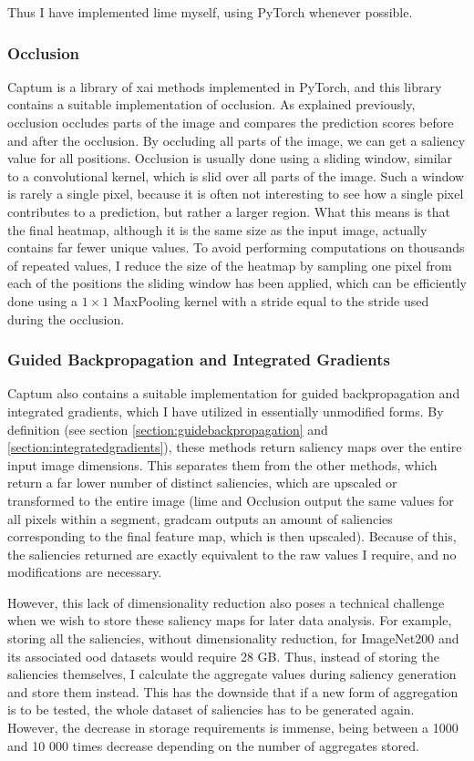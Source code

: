 \documentclass[UKenglish]{uiomasterthesis} %
\theoremstyle{definition}
\begin{document}
Thus I have implemented \ac{lime} myself, using PyTorch whenever possible.

\subsubsection{Occlusion}

Captum \cite{captum} is a library of \ac{xai} methods implemented in PyTorch, and this library contains a suitable implementation of occlusion. As explained previously, occlusion occludes parts of the image and compares the prediction scores before and after the occlusion. By occluding all parts of the image, we can get a saliency value for all positions. Occlusion is usually done using a sliding window, similar to a convolutional kernel, which is slid over all parts of the image. Such a window is rarely a single pixel, because it is often not interesting to see how a single pixel contributes to a prediction, but rather a larger region. What this means is that the final heatmap, although it is the same size as the input image, actually contains far fewer unique values. To avoid performing computations on thousands of repeated values, I reduce the size of the heatmap by sampling one pixel from each of the positions the sliding window has been applied, which can be efficiently done using a $1 \times 1$ MaxPooling kernel with a stride equal to the stride used during the occlusion.

\subsubsection{Guided Backpropagation and Integrated Gradients}

Captum also contains a suitable implementation for guided backpropagation and integrated gradients, which I have utilized in essentially unmodified forms. By definition (see section \ref{section:guidebackpropagation} and \ref{section:integratedgradients}), these methods return saliency maps over the entire input image dimensions. This separates them from the other methods, which return a far lower number of distinct saliencies, which are upscaled or transformed to the entire image (\ac{lime} and Occlusion output the same values for all pixels within a segment, \ac{gradcam} outputs an amount of saliencies corresponding to the final feature map, which is then upscaled). Because of this, the saliencies returned are exactly equivalent to the raw values I require, and no modifications are necessary.

However, this lack of dimensionality reduction also poses a technical challenge when we wish to store these saliency maps for later data analysis. For example, storing all the saliencies, without dimensionality reduction, for ImageNet200 and its associated \ac{ood} datasets would require 28 GB. Thus, instead of storing the saliencies themselves, I calculate the aggregate values during saliency generation and store them instead. This has the downside that if a new form of aggregation is to be tested, the whole dataset of saliencies has to be generated again. However, the decrease in storage requirements is immense, being between a 1000 and 10 000 times decrease depending on the number of aggregates stored.
\end{document}
